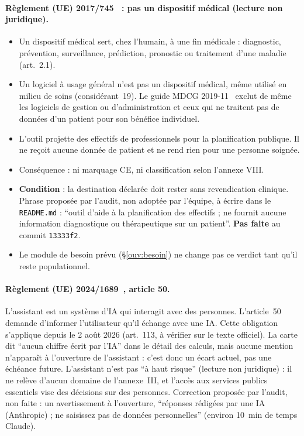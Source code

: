 \paragraph{Règlement (UE) 2017/745~\citep{e-mdr} : pas un dispositif médical (lecture non juridique).}
\begin{itemize}
\item Un dispositif médical sert, chez l'humain, à une fin médicale : diagnostic, prévention, surveillance, prédiction, pronostic ou traitement d'une maladie (art.~2.1).
\item Un logiciel à usage général n'est pas un dispositif médical, même utilisé en milieu de soins (considérant~19). Le guide MDCG 2019-11~\citep{e-mdcg} exclut de même les logiciels de gestion ou d'administration et ceux qui ne traitent pas de données d'un patient pour son bénéfice individuel.
\item L'outil projette des effectifs de professionnels pour la planification publique. Il ne reçoit aucune donnée de patient et ne rend rien pour une personne soignée.
\item Conséquence : ni marquage CE, ni classification selon l'annexe VIII.
\item \textbf{Condition} : la destination déclarée doit rester sans revendication clinique. Phrase proposée par l'audit, non adoptée par l'équipe, à écrire dans le \texttt{README.md} : \enquote{outil d'aide à la planification des effectifs ; ne fournit aucune information diagnostique ou thérapeutique sur un patient}. \textbf{Pas faite} au commit \texttt{13333f2}.
\item Le module de besoin prévu (§\ref{ouv:besoin}) ne change pas ce verdict tant qu'il reste populationnel.
\end{itemize}

\paragraph{Règlement (UE) 2024/1689~\citep{e-aiact}, article 50.}
L'assistant est un système d'IA qui interagit avec des personnes. L'article~50 demande d'informer l'utilisateur qu'il échange avec une IA.
Cette obligation s'applique depuis le 2 août 2026 (art.~113, à vérifier sur le texte officiel).
La carte dit \enquote{aucun chiffre écrit par l'IA} dans le détail des calculs, mais aucune mention n'apparaît à l'ouverture de l'assistant : c'est donc un écart actuel, pas une échéance future.
L'assistant n'est pas \enquote{à haut risque} (lecture non juridique) : il ne relève d'aucun domaine de l'annexe~III, et l'accès aux services publics essentiels vise des décisions sur des personnes.
Correction proposée par l'audit, non faite : un avertissement à l'ouverture, \enquote{réponses rédigées par une IA (Anthropic) ; ne saisissez pas de données personnelles} (environ 10\suppose{}~min de temps Claude).

